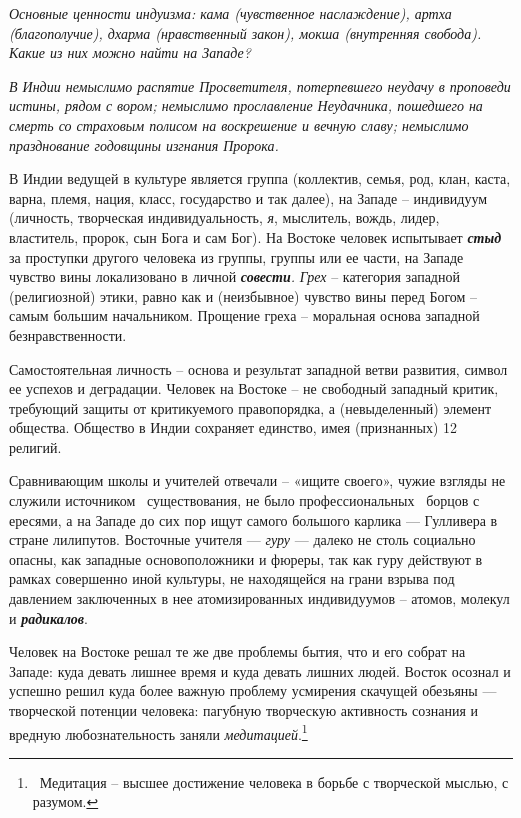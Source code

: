 \documentclass[a4paper]{article}
\begin{document}
{\itshape
Основные ценности индуизма: кама (чувственное наслаждение), артха (благополучие), дхарма (нравственный закон), мокша
(внутренняя свобода). Какие из них можно найти на Западе?}

{\itshape
В Индии немыслимо распятие Просветителя, потерпевшего неудачу в проповеди истины, рядом с вором; немыслимо прославление
Неудачника, пошедшего на смерть со страховым полисом на воскрешение и вечную славу; немыслимо празднование годовщины
изгнания Пророка.}

{
В Индии ведущей в культуре является группа (коллектив, семья, род, клан, каста, варна, племя, нация, класс, государство
и так далее), на Западе – индивидуум (личность, творческая индивидуальность, \textit{я}, мыслитель, вождь, лидер,
властитель, пророк, сын Бога и сам Бог). На Востоке человек испытывает \textbf{\textit{стыд}} за проступки другого
человека из группы, группы или ее части, на Западе чувство вины локализовано в личной
\textbf{\textit{совести}}\textit{.} \textit{Грех} – категория западной (религиозной) этики, равно как и (неизбывное)
чувство вины перед Богом – самым большим начальником. Прощение греха – {\textquotedbl}моральная основа{\textquotedbl}
западной безнравственности. }

{
Самостоятельная личность – основа и результат западной ветви развития, символ ее успехов и деградации. Человек на
Востоке – не свободный западный критик, требующий защиты от критикуемого правопорядка, а (невыделенный) элемент
общества. Общество в Индии сохраняет единство, имея (признанных) 12 религий.}

{
Сравнивающим школы и учителей отвечали – «ищите своего», чужие взгляды не служили источником \ существования, не было
профессиональных \ борцов с ересями, а на Западе до сих пор ищут самого большого карлика — Гулливера в стране
лилипутов. Восточные учителя — \textit{гуру} — далеко не столь социально опасны, как западные основоположники и фюреры,
так как гуру действуют в рамках совершенно иной культуры, не находящейся на грани взрыва под давлением заключенных в
нее атомизированных индивидуумов – атомов, молекул и \textbf{\textit{радикалов}}.}

{
Человек на Востоке решал те же две проблемы бытия, что и его собрат на Западе: куда девать лишнее время и куда девать
лишних людей. Восток осознал и успешно решил куда более важную проблему усмирения {\textquotedbl}скачущей
обезьяны{\textquotedbl} — творческой потенции человека: пагубную творческую активность сознания и вредную
любознательность заняли \textit{медитацией}.\footnote{\foreignlanguage{russian}{\ Медитация – высшее достижение
человека в борьбе с творческой мыслью, с разумом.}} }
\end{document}
